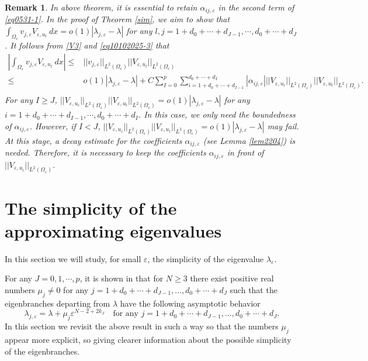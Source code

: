 \documentclass[11pt,reqno]{article}
\newtheorem{rem}[teo]{Remark}
\numberwithin{equation}{section}
\newcommand\e\varepsilon
\newcommand\la\lambda
\renewcommand\O\Omega
\begin{document}
     \begin{rem}
      In above theorem,   it is essential to retain $\alpha_{ij,\e}$ in the second term of  \eqref{eq0531-1}.  In the proof of  Theorem \ref{sim}, we aim to show that $\int_{\O_\e}v_{j,\e}V_{\e,u_l}\ dx=o(1)|\lambda_{j,\e}-\lambda|$ for any $l,j=1+d_0+\cdots+d_{J-1},\cdots,d_0+\cdots+d_J$.  It follows from \eqref{V3} and \eqref{eq10102025-3} that
      $$
      \begin{aligned}
            \left  |\int_{\O_\e}v_{j,\e}V_{\e,u_l}\ dx\right|
            \leq& ||v_{j,\e}||_{L^2(\O_\e)} ||  V_{\e,u_l}||_{L^2(\O_\e)}\\
            \leq& o(1)|\lambda_{j,\e}-\lambda|+C\sum_{I=0}^p\sum_{i=1+d_0+\cdots+d_{I-1}}^{d_0+\cdots+d_I}|\alpha_{ij,\e}| ||  V_{\e,u_i}||_{L^2(\O_\e)}||  V_{\e,u_l}||_{L^2(\O_\e)}.\\
      \end{aligned}
      $$
 For any $I\ge J$,  $||  V_{\e,u_i}||_{L^2(\O_\e)}||  V_{\e,u_l}||_{L^2(\O_\e)}=o(1)|\lambda_{j,\e}-\lambda|$ for any $i=1+d_0+\cdots+d_{I-1},\cdots,d_0+\cdots+d_I$. In this case,  we only need the boundedness of $\alpha_{ij,\e}$. However, if $I<J$, $||  V_{\e,u_i}||_{L^2(\O_\e)}||  V_{\e,u_l}||_{L^2(\O_\e)}=o(1)|\lambda_{j,\e}-\lambda|$ may fail.  At this stage, a  decay estimate for the coefficients $\alpha_{ij,\e}$  (see Lemma \ref{lem2204}) is needed. Therefore,  it is necessary to keep the coefficients $\alpha_{ij,\e}$ in front of $||  V_{\e,u_i}||_{L^2(\O_\e)}$.
     \end{rem}






    
    	\section{\bf The simplicity of the approximating eigenvalues}\label{simpl}
        In this section we will study, for small $\e$, the simplicity of the eigenvalue $\la_\e$. 
	
	

 For any $J=0,1,\cdots,p$, 
 it is shown in \cite{alm2} that for $N\ge3$ there exist positive real numbers $\mu_j\ne0$ for any $j=1+d_0+\cdots+ d_{J-1},\ldots,d_0+\cdots+d_J$ such that the eigenbranches departing from $\lambda$ have the following asymptotic behavior
    \begin{equation}
		\la_{j,\e}=\la+\mu_j\e^{N-2+2k_J} \quad \text{for any }j=1+d_0+\cdots +d_{J-1},\ldots,d_0+\cdots+d_J.
	\end{equation}
In this section we  revisit the above result in such a way so that the numbers $\mu_j$ appear more explicit, so giving clearer information about the possible simplicity of the eigenbranches.
	
\end{document}
